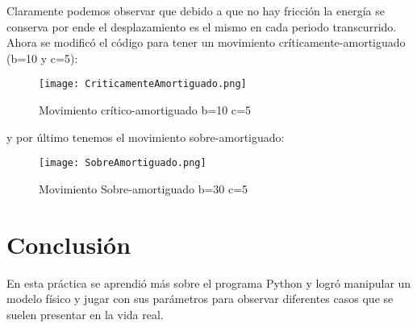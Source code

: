 \documentclass[a4 paper]{article}
\numberwithin{equation}{section}
\newcommand{\0}{\mathbf{0}}
\begin{document}
\newpage

Claramente podemos observar que debido a que no hay fricci\'on la energ\'ia se conserva por ende el desplazamiento es el mismo en cada periodo transcurrido.\\

Ahora se modific\'o el c\'odigo para tener un movimiento cr\'iticamente-amortiguado (b=10 y c=5):

\begin{figure}[!ht]
  \centering
      \texttt{[image: CriticamenteAmortiguado.png]}
  \caption{Movimiento cr\'itico-amortiguado b=10 c=5}
\end{figure}

y por \'ultimo tenemos el movimiento sobre-amortiguado:


\begin{figure}[!ht]
  \centering
      \texttt{[image: SobreAmortiguado.png]}
  \caption{Movimiento Sobre-amortiguado b=30 c=5}
\end{figure}

\section*{Conclusi\'on}

En esta pr\'actica se aprendi\'o m\'as sobre el programa Python y logr\'o manipular un modelo f\'isico y jugar con sus par\'ametros para observar diferentes casos que se suelen presentar en la vida real.
\end{document}
